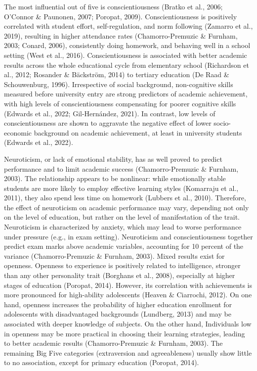\documentclass{article}
\begin{document}
The most influential out of five is conscientiousness (Bratko et al.,
2006; O'Connor \& Paunonen, 2007; Poropat, 2009). Conscientiousness is
positively correlated with student effort, self-regulation, and norm
following (Zamarro et al., 2019), resulting in higher attendance rates
(Chamorro-Premuzic \& Furnham, 2003; Conard, 2006), consistently doing
homework, and behaving well in a school setting (West et al., 2016).
Conscientiousness is associated with better academic results across the
whole educational cycle from elementary school (Richardson et al., 2012;
Rosander \& Bäckström, 2014) to tertiary education (De Raad \&
Schouwenburg, 1996). Irrespective of social background, non-cognitive
skills measured before university entry are strong predictors of
academic achievement, with high levels of conscientiousness compensating
for poorer cognitive skills (Edwards et al., 2022; Gil-Hernández, 2021).
In contrast, low levels of conscientiousness are shown to aggravate the
negative effect of lower socio-economic background on academic
achievement, at least in university students (Edwards et al., 2022).

Neuroticism, or lack of emotional stability, has as well proved to
predict performance and to limit academic success (Chamorro-Premuzic \&
Furnham, 2003). The relationship appears to be nonlinear: while
emotionally stable students are more likely to employ effective learning
styles (Komarraju et al., 2011), they also spend less time on homework
(Lubbers et al., 2010). Therefore, the effect of neuroticism on academic
performance may vary, depending not only on the level of education, but
rather on the level of manifestation of the trait. Neuroticism is
characterized by anxiety, which may lead to worse performance under
pressure (e.g., in exam setting). Neuroticism and conscientiousness
together predict exam marks above academic variables, accounting for 10
percent of the variance (Chamorro-Premuzic \& Furnham, 2003). Mixed
results exist for openness. Openness to experience is positively related
to intelligence, stronger than any other personality trait (Borghans et
al., 2008), especially at higher stages of education (Poropat, 2014).
However, its correlation with achievements is more pronounced for
high-ability adolescents (Heaven \& Ciarrochi, 2012). On one hand,
openness increases the probability of higher education enrollment for
adolescents with disadvantaged backgrounds (Lundberg, 2013) and may be
associated with deeper knowledge of subjects. On the other hand,
Individuals low in openness may be more practical in choosing their
learning strategies, leading to better academic results
(Chamorro-Premuzic \& Furnham, 2003). The remaining Big Five categories
(extraversion and agreeableness) usually show little to no association,
except for primary education (Poropat, 2014).
\end{document}
